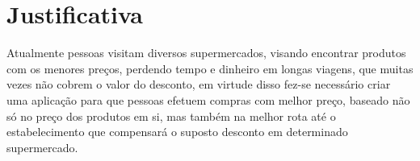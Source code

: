 
\section{Justificativa}
Atualmente pessoas visitam diversos supermercados, visando encontrar produtos com os menores preços,
perdendo tempo e dinheiro em longas viagens, que muitas vezes não cobrem o valor do desconto,
em virtude disso fez-se necessário criar uma aplicação para que pessoas efetuem compras com melhor preço,
baseado não só no preço dos produtos em si, mas também na melhor rota até o estabelecimento que
compensará o suposto desconto em determinado supermercado.